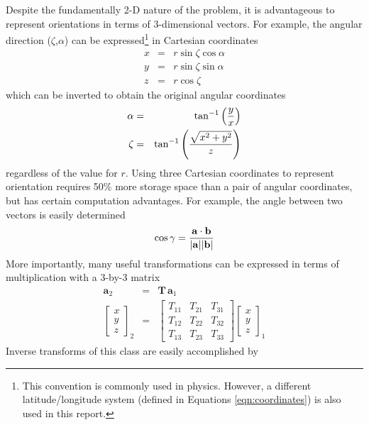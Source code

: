 \documentclass[11pt,twoside]{article}   %
\begin{document}
Despite the fundamentally 2-D nature of the problem, it is
advantageous to represent orientations in terms of 3-dimensional
vectors.  For example, the angular direction ($\zeta$,$\alpha$)
can be expressed\footnote{This convention is commonly used in
physics.  However, a different latitude/longitude system (defined
in Equations \ref{eqn:coordinates}) is also used in this report.}
in Cartesian coordinates
 \begin{eqnarray}
  x &=& r \sin\zeta \cos\alpha \\
  y &=& r \sin\zeta \sin\alpha \\
  z &=& r \cos\zeta
 \end{eqnarray}
which can be inverted to obtain the original angular coordinates
 \begin{eqnarray}
  \alpha &=& \tan^{-1}\left ( {y \over x } \right ) \\
  \zeta &=& \tan^{-1}\left ( {\sqrt{x^2 + y^2} \over z} \right )
 \end{eqnarray}
regardless of the value for $r$.  Using three Cartesian
coordinates to represent orientation requires 50\% more storage
space than a pair of angular coordinates, but has certain
computation advantages. For example, the angle between two vectors
is easily determined
 \begin{equation}
  \cos\gamma = {{\mathbf{a} \cdot \mathbf{b}}\over{|\mathbf{a}| |\mathbf{b}|}}
 \end{equation}
More importantly, many useful transformations can be expressed in
terms of multiplication with a 3-by-3 matrix
 \begin{eqnarray}
  \mathbf{a}_2 &=& \mathbf{T} \, \mathbf{a}_1 \\
 \left [ \begin{array}{c} x \\ y \\ z \end{array} \right ]_2 &=&
  \left [\begin{array}{ccc}
  T_{11} & T_{21} & T_{31} \\
  T_{12} & T_{22} & T_{32} \\
  T_{13} & T_{23} & T_{33}
 \end{array} \right ]
  \left [ \begin{array}{c}  x \\ y \\ z \end{array} \right ]_1
 \end{eqnarray}
Inverse transforms of this class are easily accomplished by
\end{document}

